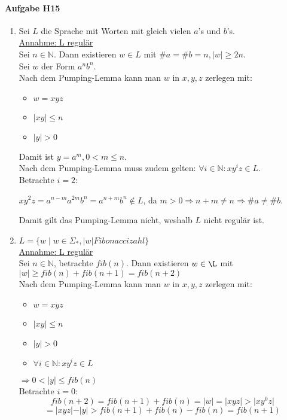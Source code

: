 \documentclass[11pt]{article}
\begin{document}
\paragraph{Aufgabe H15}
\begin{enumerate}[label=\alph*)]
\item Sei $L$ die Sprache mit Worten mit gleich vielen $a$'s und $b$'s.\\
\underline{Annahme: L regulär}\\
Sei $n\in\mathbb{N}$. Dann existieren $w\in L$ mit $\# a = \# b = n, \vert w \vert \geq 2n$.\\
Sei $w$ der Form $a^{n}b^{n}$.\\
Nach dem Pumping-Lemma kann man $w$ in $x,y,z$ zerlegen mit:
\begin{itemize}
\item $w=xyz$
\item $\vert xy \vert \leq n$
\item $\vert y \vert > 0$
\end{itemize}
Damit ist $y=a^{m}, 0<m\leq n$.\\
Nach dem Pumping-Lemma muss zudem gelten: $\forall i\in\mathbb{N}: xy^{i}z \in L$.\\
Betrachte $i=2$:
\begin{center}
$xy^2z=a^{n-m}a^{2m}b^{n}=a^{n+m}b^{n} \not\in L$, da $m>0 \Rightarrow n+m \neq n \Rightarrow \# a \neq \# b$.
\end{center}
Damit gilt das Pumping-Lemma nicht, weshalb $L$ nicht regulär ist.
\item $L=\{w\mid w\in \Sigma_{*}, \vert w \vert Fibonaccizahl\}$\\
\underline{Annahme: L regulär}\\
Sei $n \in\mathbb{N}$, betrachte $fib(n)$. Dann existieren $w\in\L$ mit $\vert w \vert \geq fib(n) + fib(n+1) = fib(n+2)$\\
Nach dem Pumping-Lemma kann man $w$ in $x,y,z$ zerlegen mit:
\begin{itemize}
\item $w=xyz$
\item $\vert xy \vert \leq n$
\item $\vert y \vert > 0$
\item $\forall i\in\mathbb{N}: xy^{i}z \in L$
\end{itemize}
$\Rightarrow 0<\vert y \vert \leq fib(n)$\\
Betrachte $i=0$:
\[fib(n+2)=fib(n+1)+fib(n)=\vert w \vert = \vert xyz \vert > \vert xy^0z \vert\] \[= \vert xyz \vert - \vert y \vert > fib(n+1) + fib(n) - fib(n) = fib(n+1)\]

\end{enumerate}
\end{document}
